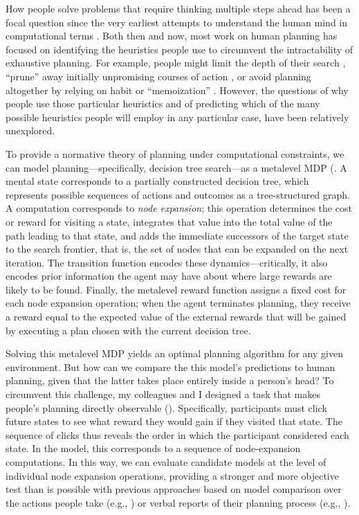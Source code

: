 \documentclass[11pt,a4paperpaper,]{article}
\begin{document}
How people solve problems that require thinking multiple steps ahead has been a focal question since the very earliest attempts to understand the human mind in computational terms \citep{newell1956logic,newell1972human}. Both then and now, most work on human planning has focused on identifying the heuristics people use to circumvent the intractability of exhaustive planning. For example, people might limit the depth of their search \citep{macgregor2001information,keramati2016adaptive,krusche2018adaptive,snider2015prospective}, ``prune'' away initially unpromising courses of action \citep{huys2012bonsai,huys2015interplay}, or avoid planning altogether by relying on habit or ``memoization'' \citep{huys2015interplay,kool2017costbenefit}. However, the questions of why people use those particular heuristics and of predicting which of the many possible heuristics people will employ in any particular case, have been relatively unexplored.

To provide a normative theory of planning under computational constraints, we can model planning---specifically, decision tree search---as a metalevel MDP (. A mental state corresponds to a partially constructed decision tree, which represents possible sequences of actions and outcomes as a tree-structured graph. A computation corresponds to \emph{node expansion}; this operation determines the cost or reward for visiting a state, integrates that value into the total value of the path leading to that state, and adds the immediate successors of the target state to the search frontier, that is, the set of nodes that can be expanded on the next iteration. The transition function encodes these dynamics---critically, it also encodes prior information the agent may have about where large rewards are likely to be found. Finally, the metalevel reward function assigns a fixed cost for each node expansion operation; when the agent terminates planning, they receive a reward equal to the expected value of the external rewards that will be gained by executing a plan chosen with the current decision tree.

Solving this metalevel MDP yields an optimal planning algorithm for any given environment. But how can we compare the this model's predictions to human planning, given that the latter takes place entirely inside a person's head? To circumvent this challenge, my colleagues and I designed a task that makes people's planning directly observable (). Specifically, participants must click future states to see what reward they would gain if they visited that state. The sequence of clicks thus reveals the order in which the participant considered each state. In the model, this corresponds to a sequence of node-expansion computations. In this way, we can evaluate candidate models at the level of individual node expansion operations, providing a stronger and more objective test than is possible with previous approaches based on model comparison over the actions people take (e.g., \citealp{huys2015interplay,vanopheusden2017computational}) or verbal reports of their planning process (e.g., \citealp{degroot1965thought,newell1972human}).
\end{document}
